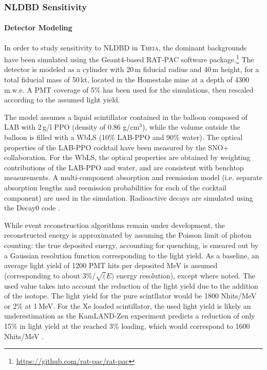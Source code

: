 \subsubsection{NLDBD Sensitivity}
\label{sec::sensitivity}
\paragraph{Detector Modeling}
In order to study sensitivity to NLDBD in \textsc{Theia}, the dominant
backgrounds have been simulated using the Geant4-based RAT-PAC software
package.\footnote{\url{https://github.com/rat-pac/rat-pac}}
The detector is modeled as a cylinder with 20\,m fiducial radius and 40\,m height, for a
total fiducial mass of 50\,kt, located in the Homestake mine at a depth of 4300\,m.w.e.
A PMT coverage of 5\% has been used for the simulations, then rescaled
according to the assumed light yield.

The model assumes a liquid scintillator contained in the balloon
composed of LAB with 2\,g/l PPO (density of 0.86 g/cm$^3$), while the volume outside the balloon is
filled with a WbLS (10\% LAB-PPO and 90\% water). The optical properties of
the LAB-PPO cocktail have been measured by the SNO+ collaboration. For the
WbLS, the optical properties are obtained by weighting contributions of the
LAB-PPO and water, and are consistent with benchtop measurements.
A multi-component absorption and reemission model (i.e. separate absorption
lengths and reemission probabilities for each of the cocktail component) are
used in the simulation. Radioactive decays are simulated using the Decay0
code \cite{decay0}.

While event reconstruction algorithms remain under development, the
reconstructed energy is approximated by assuming the Poisson limit of
photon counting: the true deposited energy, accounting for quenching, is
smeared out by a Gaussian resolution function corresponding to the light
yield. As a baseline, an average light yield of 1200 PMT hits per deposited
MeV is assumed (corresponding to about 3\%/$\sqrt(E)$ energy resolution), except where noted. The used value takes into account the reduction of the light yield due to the addition of the isotope. The light yield for the pure scintllator would be 1800 Nhits/MeV or 2\% at 1\,MeV. For the Xe loaded scintillator, the used light yield is likely an underestimation as the KamLAND-Zen experiment predicts a reduction of only 15\% in light yield at the reached 3\% loading, which would correspond to 1600 Nhits/MeV \cite{KZ-2011}.

